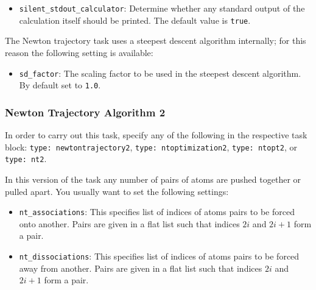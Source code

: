 \documentclass[]{tufte-book}
\begin{document}
\begin{itemize}
\item \texttt{silent\_stdout\_calculator}: Determine whether any standard output of the calculation itself should be printed. The default value is \texttt{true}.
\end{itemize}

The Newton trajectory task uses a steepest descent algorithm internally; for this reason the following setting is available:
\begin{itemize}
\item \texttt{sd\_factor}: The scaling factor to be used in the steepest descent algorithm. By default set to \texttt{1.0}.
\end{itemize}

\subsubsection{Newton Trajectory Algorithm 2}
In order to carry out this task, specify any of the following in the respective task block:
\texttt{type: newtontrajectory2}, \texttt{type: ntoptimization2}, \texttt{type: ntopt2}, or \texttt{type: nt2}.

In this version of the task any number of pairs of atoms are pushed together or pulled apart.
You usually want to set the following settings:
\begin{itemize}
\item \texttt{nt\_associations}: This specifies list of indices of atoms pairs to be forced onto another.
 Pairs are given in a flat list such that indices $2i$ and $2i+1$ form a pair.
\item \texttt{nt\_dissociations}: This specifies list of indices of atoms pairs to be forced away from another.
 Pairs are given in a flat list such that indices $2i$ and $2i+1$ form a pair.
\end{itemize}
\end{document}
